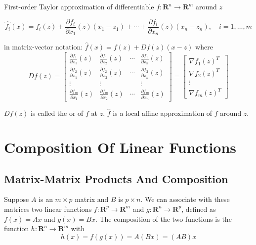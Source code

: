 \begin{theorem}
    First-order Taylor approximation of differentiable $ f: \mathbf{R}^{n} \rightarrow \mathbf{R}^{m} $ around $ z $

\begin{equation}
\hat{f_{i}}(x)=f_{i}(z)+\frac{\partial f_{i}}{\partial x_{1}}(z)\left(x_{1}-z_{1}\right)+\cdots+\frac{\partial f_{i}}{\partial x_{n}}(z)\left(x_{n}-z_{n}\right), \quad i=1, \ldots, m
\end{equation}

in matrix-vector notation: $ \hat{f}(x)=f(z)+D f(z)(x-z) $ where
\begin{equation}
D f(z)=\left[\begin{array}{cccc}
\frac{\partial f_{1}}{\partial x_{1}}(z) & \frac{\partial f_{1}}{\partial x_{2}}(z) & \cdots & \frac{\partial f_{1}}{\partial x_{n}}(z) \\
\frac{\partial f_{2}}{\partial x_{1}}(z) & \frac{\partial f_{2}}{\partial x_{2}}(z) & \cdots & \frac{\partial f_{2}}{\partial x_{n}}(z) \\
\vdots & \vdots & & \vdots \\
\frac{\partial f_{m}}{\partial x_{1}}(z) & \frac{\partial f_{m}}{\partial x_{2}}(z) & \cdots & \frac{\partial f_{m}}{\partial x_{n}}(z)
\end{array}\right]=\left[\begin{array}{c}
\nabla f_{1}(z)^{T} \\
\nabla f_{2}(z)^{T} \\
\vdots \\
\nabla f_{m}(z)^{T}
\end{array}\right]
\end{equation}

$ D f(z) $ is called the  or  of $ f $ at $ z $, $ \hat{f} $ is a local affine approximation of $ f $ around $ z $.
\end{theorem}

\section{Composition Of Linear Functions}

\subsection{Matrix-Matrix Products And Composition}

Suppose $ A $ is an $ m \times p $ matrix and $ B $ is $ p \times n $. We can associate with these matrices two linear functions $ f: \mathbf{R}^{p} \rightarrow \mathbf{R}^{m} $ and $ g: \mathbf{R}^{n} \rightarrow \mathbf{R}^{p} $, defined as $ f(x)=A x $ and $ g(x)=B x $. The composition of the two functions is the function $ h: \mathbf{R}^{n} \rightarrow \mathbf{R}^{m} $ with
\begin{equation}
h(x)=f(g(x))=A(B x)=(A B) x
\end{equation}

